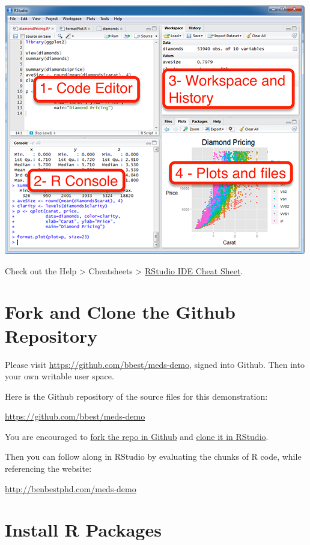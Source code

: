 \documentclass[]{book}
\begin{document}
\includegraphics{images/rstudio.png}

Check out the Help \textgreater{} Cheatsheets \textgreater{} \href{https://github.com/rstudio/cheatsheets/raw/master/rstudio-ide.pdf}{RStudio IDE Cheat Sheet}.

\hypertarget{fork-and-clone-the-github-repository}{%
\section{Fork and Clone the Github Repository}\label{fork-and-clone-the-github-repository}}

Please visit \url{https://github.com/bbest/meds-demo}, signed into Github. Then into your own writable user space.

Here is the Github repository of the source files for this demonstration:

\url{https://github.com/bbest/meds-demo}

You are encouraged to \href{https://help.github.com/en/github/getting-started-with-github/fork-a-repo}{fork the repo in Github} and \href{https://happygitwithr.com/rstudio-git-github.html\#clone-the-new-github-repository-to-your-computer-via-rstudio}{clone it in RStudio}.

Then you can follow along in RStudio by evaluating the chunks of R code, while referencing the website:

\url{http://benbestphd.com/meds-demo}

\hypertarget{install-r-packages}{%
\section{Install R Packages}\label{install-r-packages}}
\end{document}
